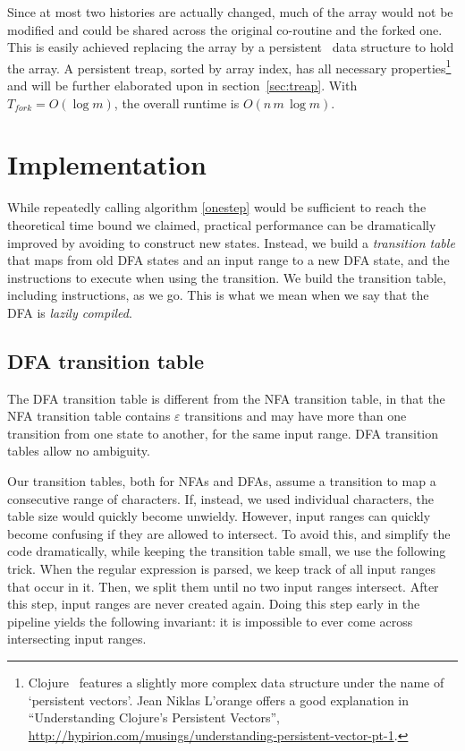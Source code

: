 \documentclass[11pt]{Thesis}
\theoremstyle{definition}
\newcommand{\Secref}[1]{section~\ref{sec:#1}}
\begin{document}
Since at most two histories are actually changed, much of the 
array would not be modified and could be shared across the original
co-routine and the forked one. This is easily achieved replacing the
array by a persistent~\cite{Dris89a} data structure to hold the 
array. A persistent treap, sorted by array index, has all necessary
properties\footnote{Clojure~\cite{Hick08} features a slightly more complex data
structure under the name of `persistent vectors'. Jean Niklas L'orange offers a
good explanation in ``Understanding Clojure's Persistent Vectors'',
\url{http://hypirion.com/musings/understanding-persistent-vector-pt-1}.} and
will be further elaborated upon in \Secref{treap}. With $T_{fork}=O(\log m)$,
the overall runtime is $O(n\,m\,\log m)$.

\chapter{Implementation}
While repeatedly calling algorithm \ref{onestep} would be sufficient
to reach the theoretical time bound we claimed, practical performance
can be dramatically improved by avoiding to construct new states.
Instead, we build a \emph{transition table} that maps from old DFA
states and an input range to a new DFA state, and the instructions
to execute when using the transition. We build the transition table,
including instructions, as we go. This is what we mean when we say
that the DFA is \emph{lazily compiled}. 

\section{DFA transition table}
The DFA transition table is different from the NFA transition table,
in that the NFA transition table contains $\varepsilon$ transitions and
may have more than one transition from one state to another, for
the same input range. DFA transition tables allow no ambiguity.

Our transition tables, both for NFAs and DFAs, assume a transition
to map a consecutive range of characters. If, instead, we used
individual characters, the table size would quickly become unwieldy.
However, input ranges can quickly become confusing if they are
allowed to intersect. To avoid this, and simplify the code dramatically,
while keeping the transition table small, we use the following
trick. When the regular expression is parsed, we keep track of all
input ranges that occur in it. Then, we split them until no two
input ranges intersect.  After this step, input ranges are never
created again.  Doing this step early in the pipeline yields the
following invariant: it is impossible to ever come across intersecting
input ranges.
\end{document}
